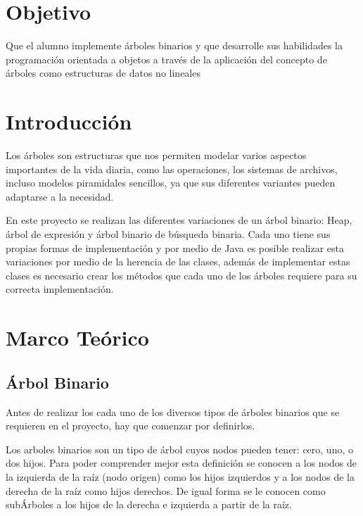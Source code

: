 \documentclass[12pt,a4paper]{article}
\begin{document}
	\restoregeometry
	\renewcommand{\footrulewidth}{1pt}
	\tableofcontents
	\vfill
	\clearpage
	
	\section{Objetivo}
	Que el alumno implemente árboles binarios y que desarrolle sus habilidades la programación orientada a objetos a través de la aplicación del concepto de árboles como estructuras de datos no lineales
	
	\section{Introducción}
	Los árboles son estructuras que nos permiten modelar varios aspectos importantes de la vida diaria, como las operaciones, los sistemas de archivos, incluso modelos piramidales sencillos, ya que sus diferentes variantes pueden adaptarse a la necesidad. 
	
	En este proyecto se realizan las diferentes variaciones de un árbol binario: Heap, árbol de expresión y árbol binario de búsqueda binaria. Cada uno tiene sus propias formas de implementación y por medio de Java es posible realizar esta variaciones por medio de la herencia de las clases, además de implementar estas clases es necesario crear los métodos que cada uno de los árboles requiere para su correcta implementación.
	
	\section{Marco Teórico}
		\subsection{Árbol Binario}
	Antes de realizar los cada uno de los diversos tipos de árboles binarios que se requieren en el proyecto, hay que comenzar por definirlos. 
	
	Los arboles binarios son un tipo de árbol cuyos nodos pueden tener: cero, uno, o dos hijos. Para poder comprender mejor esta definición se conocen a los nodos de la izquierda de la raíz (nodo origen) como los hijos izquierdos y  a los nodos de la derecha de la raíz como hijos derechos. De igual forma se le conocen como subÁrboles a los hijos de la derecha e izquierda a partir de la raíz.
\end{document}
